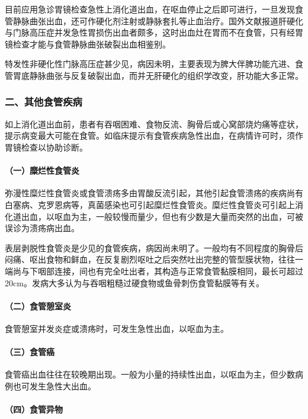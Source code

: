 目前应用急诊胃镜检查急性上消化道出血，在呕血停止之后即可进行，一旦发现食管静脉曲张出血，还可作硬化剂注射或静脉套扎等止血治疗。国外文献报道肝硬化与门脉高压症并发急性胃损伤出血者颇多，这时出血灶在胃而不在食管，只有经胃镜检查才能与食管静脉曲张破裂出血相鉴别。

特发性非硬化性门脉高压症甚少见，病因未明，主要表现为脾大伴脾功能亢进、食管胃底静脉曲张与反复破裂出血，而并无肝硬化的组织学改变，肝功能大多正常。

\subsubsection{二、其他食管疾病}

如上消化道出血前，患者有吞咽困难、食物反流、胸骨后或心窝部烧灼痛等症状，提示病变最大可能在食管。如临床提示有食管疾病急性出血，在病情许可时，须作胃镜检查以协助诊断。

\paragraph{（一）糜烂性食管炎}

弥漫性糜烂性食管炎或食管溃疡多由胃酸反流引起，其他引起食管溃疡的疾病尚有白塞病、克罗恩病等，真菌感染也可引起糜烂性食管炎。糜烂性食管炎可引起上消化道出血，以呕血为主，一般较慢而量少，但也有少数是大量而突然的出血，可被误诊为溃疡病出血。

表层剥脱性食管炎是少见的食管疾病，病因尚未明了。一般均有不同程度的胸骨后闷痛、呕出食物和鲜血，在反复剧烈呕吐之后突然吐出完整的管型膜状物，往往一端尚与下咽部连接，间也有完全吐出者，其构造与正常食管黏膜相同，最长可超过20cm。发病大多认为与吞咽粗糙过硬食物或鱼骨刺伤食管黏膜等有关。

\paragraph{（二）食管憩室炎}

食管憩室并发炎症或溃疡时，可发生急性出血，以呕血为主。

\paragraph{（三）食管癌}

食管癌出血往往在较晚期出现。一般为小量的持续性出血，以呕血为主，但少数病例也可发生急性大出血。

\paragraph{（四）食管异物}


